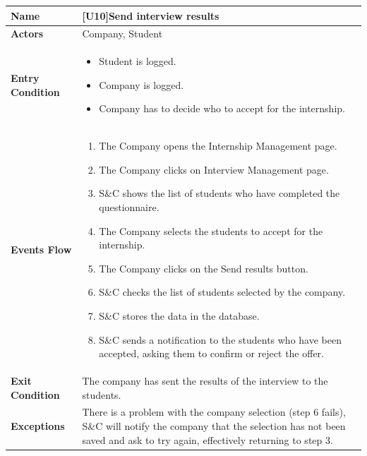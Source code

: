\begin{center}
    \begin{tabular}{|p{9em}|p{27em}|}
        \hline
        \rowcolor{bluepoli!40} %
        \textbf{Name} & \textbf{[U10]Send interview results} \\
        \hline
        \textbf{Actors} & Company, Student\\
        \hline
        \textbf{Entry Condition} & 
        \begin{itemize}
            \item Student is logged.
            \item Company is logged.
            \item Company has to decide who to accept for the internship.
        \end{itemize} \\
        \hline
        \textbf{Events Flow} & 
        \begin{enumerate}
            \item The Company opens the Internship Management page.
            \item The Company clicks on Interview Management page.
            \item S\&C shows the list of students who have completed the questionnaire.
            \item The Company selects the students to accept for the internship.
            \item The Company clicks on the Send results button.
            \item S\&C checks the list of students selected by the company.
            \item S\&C stores the data in the database.
            \item S\&C sends a notification to the students who have been accepted, asking them to confirm or reject the offer.
        \end{enumerate} \\
        \hline
        \textbf{Exit Condition} & The company has sent the results of the interview to the students.\\
        \hline
        \textbf{Exceptions} & There is a problem with the company selection (step 6 fails), S\&C will notify the company that the selection
        has not been saved and ask to try again, effectively returning to step 3.\\
        \hline
    \end{tabular}
\end{center}

